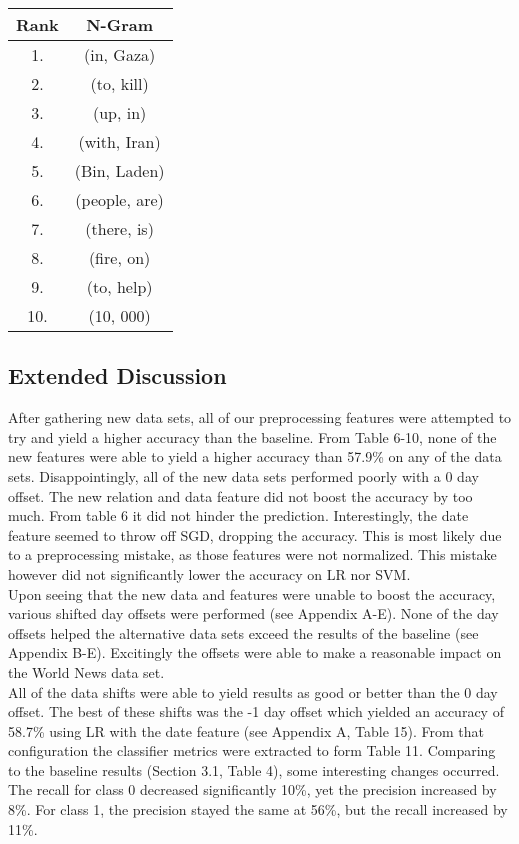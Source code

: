 \documentclass[11pt,a4paper]{article}
\begin{document}
\vspace{5mm}
\begin{center}
\begin{tabular}{ |c|c| }
 \hline
 Rank & N-Gram\\
 \hline
 1. & (in, Gaza)\\
 2. & (to, kill)\\
 3. & (up, in)\\
 4. & (with, Iran)\\
 5. & (Bin, Laden)\\
 6. & (people, are)\\
 7. & (there, is)\\
 8. & (fire, on)\\
 9. & (to, help)\\
 10. & (10, 000)\\
 \hline
\end{tabular}
\end{center}



\subsection{Extended Discussion}
After gathering new data sets, all of our preprocessing features were attempted to try and yield a higher accuracy than the baseline. From Table 6-10, none of the new features were able to yield a higher accuracy than 57.9\% on any of the data sets. Disappointingly, all of the new data sets performed poorly with a 0 day offset. The new relation and data feature did not boost the accuracy by too much. From table 6 it did not hinder the prediction. Interestingly, the date feature seemed to throw off SGD, dropping the accuracy. This is most likely due to a preprocessing mistake, as those features were not normalized. This mistake however did not significantly lower the accuracy on LR nor SVM.\\

Upon seeing that the new data and features were unable to boost the accuracy, various shifted day offsets were performed (see Appendix A-E). None of the day offsets helped the alternative data sets exceed the results of the baseline (see Appendix B-E). Excitingly the offsets were able to make a reasonable impact on the World News data set.\\

All of the data shifts were able to yield results as good or better than the 0 day offset. The best of these shifts was the -1 day offset which yielded an accuracy of 58.7\% using LR with the date feature (see Appendix A, Table 15). From that configuration the classifier metrics were extracted to form Table 11. Comparing to the baseline results (Section 3.1, Table 4), some interesting changes occurred. The recall for class 0 decreased significantly 10\%, yet the precision increased by 8\%. For class 1, the precision stayed the same at 56\%, but the recall increased by 11\%.\\
\end{document}

